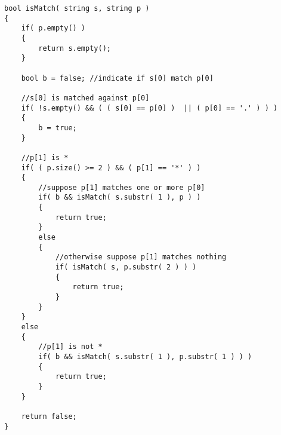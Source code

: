 \begin{lstlisting}[style=customc, caption={Recursion}]
bool isMatch( string s, string p )
{
    if( p.empty() )
    {
        return s.empty();
    }

    bool b = false; //indicate if s[0] match p[0]

    //s[0] is matched against p[0]
    if( !s.empty() && ( ( s[0] == p[0] )  || ( p[0] == '.' ) ) )
    {
        b = true;
    }

    //p[1] is *
    if( ( p.size() >= 2 ) && ( p[1] == '*' ) )
    {
        //suppose p[1] matches one or more p[0]
        if( b && isMatch( s.substr( 1 ), p ) )
        {
            return true;
        }
        else
        {
            //otherwise suppose p[1] matches nothing
            if( isMatch( s, p.substr( 2 ) ) )
            {
                return true;
            }
        }
    }
    else
    {
        //p[1] is not *
        if( b && isMatch( s.substr( 1 ), p.substr( 1 ) ) )
        {
            return true;
        }
    }

    return false;
}

\end{lstlisting}
